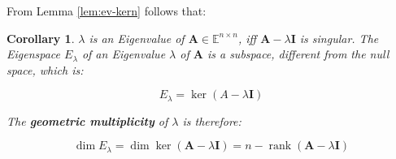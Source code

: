 \documentclass[a4paper,12pt]{article}
\newcommand{\E}{\mathbb{E}}
\newcommand{\I}{\mat{I}}
\newcommand{\A}{\mat{A}}
\newcommand{\rank}[1]{\operatorname{rank} #1}
\newcommand{\Er}{E_{\lambda}}
\newcommand{\mat}[1]{\mathbf{#1}}
\theoremstyle{plain}
\newtheorem{corollary}{Corollary}[lemma]
\numberwithin{equation}{section}
\begin{document}
From Lemma \ref{lem:ev-kern} follows that:

\begin{corollary}
\label{er-mat}
    $\lambda$ is an Eigenvalue of $\A \in \E^{n \times n}$, iff $\A - \lambda \I$ is singular.
    The Eigenspace $\Er$ of an Eigenvalue $\lambda$ of $\A$ is a subspace,
    different from the null space, which is:

    \begin{equation}
        \Er = \ker (A - \lambda \I)
    \end{equation}

    The \textbf{geometric multiplicity} of $\lambda$ is therefore:

    \begin{equation}
        \dim \Er = \dim \ker (\A - \lambda \I) = n - \rank (\A - \lambda \I)
    \end{equation}
\end{corollary}
\end{document}
